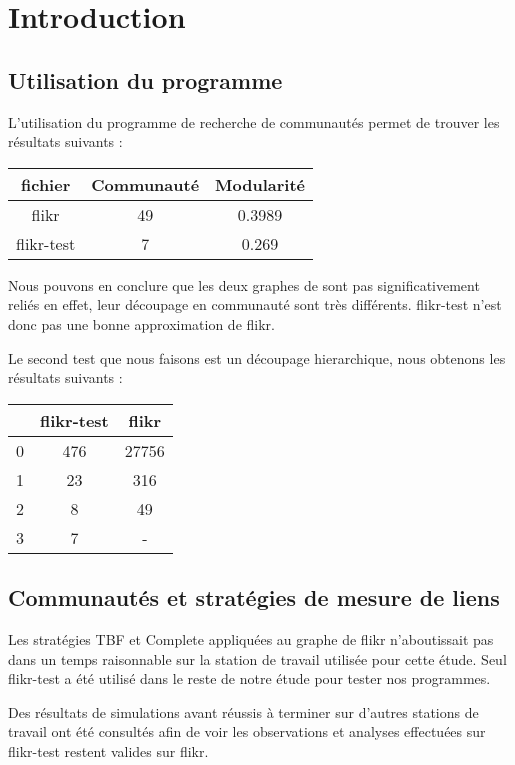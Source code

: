 \section{Introduction}

\subsection{Utilisation du programme}

L'utilisation du programme de recherche de communautés permet de trouver
les résultats suivants :

\begin{center}
\begin{tabular}{|c|c|c|}
  fichier & Communauté & Modularité \\ \hline
  flikr & 49 & 0.3989\\
  flikr-test & 7 & 0.269 \\
\end{tabular}
\end{center}

Nous pouvons en conclure que les deux graphes de sont pas significativement reliés
en effet, leur découpage en communauté sont très différents. flikr-test n'est donc
pas une bonne approximation de flikr.

Le second test que nous faisons est un découpage hierarchique, nous obtenons les résultats
suivants :

\begin{center}
\begin{tabular}{|c|c|c|}
 & flikr-test & flikr \\ \hline
0 & 476 & 27756 \\
1 & 23 & 316 \\
2 & 8 & 49 \\
3 & 7 & - \\
\end{tabular}
\end{center}


\subsection{Communautés et stratégies de mesure de liens}

Les stratégies TBF et Complete appliquées au graphe de flikr
n'aboutissait pas dans un temps raisonnable
sur la station de travail utilisée pour cette étude. Seul flikr-test
 a été utilisé dans le reste de notre étude pour tester nos programmes.

Des résultats de simulations avant réussis à terminer sur d'autres stations de travail ont
été consultés afin de voir les observations et analyses effectuées sur flikr-test restent
valides sur flikr.


